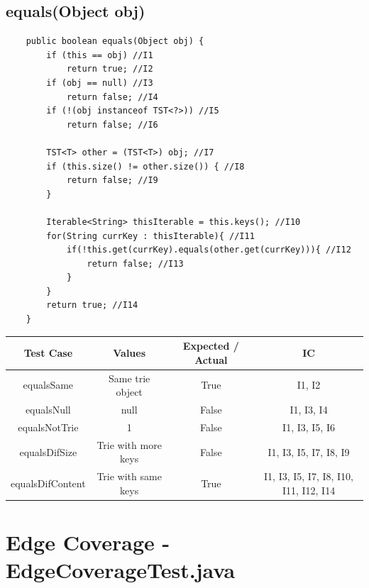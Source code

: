 \documentclass[12pt]{article}
\begin{document}
\subsection{equals(Object obj)}
\begin{lstlisting}
	public boolean equals(Object obj) {
		if (this == obj) //I1
			return true; //I2
		if (obj == null) //I3
			return false; //I4
		if (!(obj instanceof TST<?>)) //I5
			return false; //I6
		
		TST<T> other = (TST<T>) obj; //I7
		if (this.size() != other.size()) { //I8
			return false; //I9
		}
			
		Iterable<String> thisIterable = this.keys(); //I10
        for(String currKey : thisIterable){ //I11
            if(!this.get(currKey).equals(other.get(currKey))){ //I12
                return false; //I13
            }
        }
		return true; //I14
	}
\end{lstlisting}

\begin{table}[htb]
\centering
\begin{tabular}{| c | c | c | c |} 
 \hline
 Test Case & Values & Expected / Actual & IC\\ \hline
 equalsSame & Same trie object & True & I1, I2 \\ \hline
 equalsNull & null & False & I1, I3, I4 \\ \hline
 equalsNotTrie & 1 & False & I1, I3, I5, I6 \\ \hline
 equalsDifSize & Trie with more keys & False & I1, I3, I5, I7, I8, I9 \\ \hline
 equalsDifContent & Trie with same keys & True & I1, I3, I5, I7, I8, I10, I11, I12, I14 \\ \hline

\end{tabular}
\end{table}

\section{Edge Coverage - EdgeCoverageTest.java}
\end{document}
